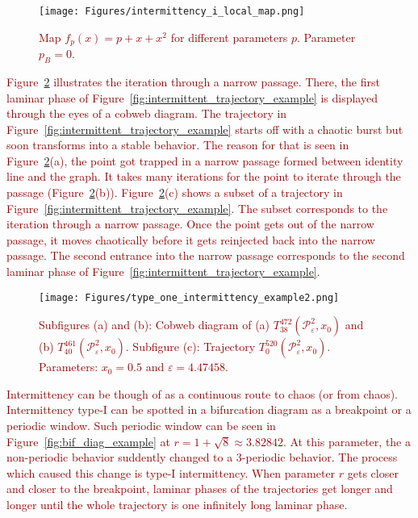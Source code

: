 \begin{figure}[!h]
    \centering
    \texttt{[image: Figures/intermittency\_i\_local\_map.png]}
    \caption{
        \textcolor{darkred}{
        Map $f_{p}(x) = p + x + x^2$ for different parameters $p$. 
        Parameter $p_B = 0$.
        }
    }
    \label{fig:saddle_node_bifurcation}
\end{figure}

\par
\textcolor{darkred}{
Figure~\ref{fig:intermittent_cobweb_example} illustrates the iteration through a narrow passage.
There, the first laminar phase of Figure~\ref{fig:intermittent_trajectory_example} is displayed through the eyes of a cobweb diagram.
The trajectory in Figure~\ref{fig:intermittent_trajectory_example} starts off with a chaotic burst but soon transforms into a stable behavior.
The reason for that is seen in Figure~\ref{fig:intermittent_cobweb_example}(a), the point got trapped in a narrow passage formed between identity line and the graph.
It takes many iterations for the point to iterate through the passage (Figure~\ref{fig:intermittent_cobweb_example}(b)).
Figure~\ref{fig:intermittent_cobweb_example}(c) shows a subset of a trajectory in Figure~\ref{fig:intermittent_trajectory_example}.
The subset corresponds to the iteration through a narrow passage.
Once the point gets out of the narrow passage, it moves chaotically before it gets reinjected back into the narrow passage.
The second entrance into the narrow passage corresponds to the second laminar phase of Figure~\ref{fig:intermittent_trajectory_example}.
}

\begin{figure}[!h]
    \centering
    \texttt{[image: Figures/type\_one\_intermittency\_example2.png]}
    \caption{
        \textcolor{darkred}{
        Subfigures (a) and (b):
        Cobweb diagram of 
        (a) $T^{472}_{38}(\mathcal{P}_{\varepsilon}^{2}, x_0)$ and
        (b) $T^{461}_{40}(\mathcal{P}_{\varepsilon}^{2}, x_0)$. 
        Subfigure (c):
        Trajectory $T^{520}_{0}(\mathcal{P}_{\varepsilon}^{2}, x_0)$.
        Parameters: $x_0 = 0.5$ and $\varepsilon = 4.47458$.
        }
    }
    \label{fig:intermittent_cobweb_example}
\end{figure}

\par
\textcolor{darkred}{
Intermittency can be though of as a continuous route to chaos (or from chaos).
Intermittency type-I can be spotted in a bifurcation diagram as a breakpoint or a periodic window.
Such periodic window can be seen in Figure~\ref{fig:bif_diag_example} at $r = 1+\sqrt{8} \approx 3.82842$.
At this parameter, the a non-periodic behavior suddently changed to a $3$-periodic behavior.
The process which caused this change is type-I intermittency.
When parameter $r$ gets closer and closer to the breakpoint, laminar phases of the trajectories get longer and longer until the whole trajectory is one infinitely long laminar phase.
}


